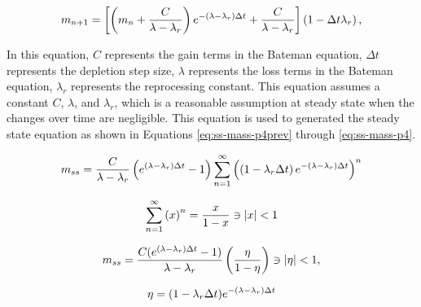 \begin{equation} \hfill 
m_{n+1} = \left[ \left(m_n + \frac{C}{\lambda - \lambda_r} \right)e^{-(\lambda - \lambda_r) \Delta t} + \frac{C}{\lambda - \lambda_r} \right] \left(1 - \Delta t \lambda_r \right),
\hfill\label{eq:nplusone-gen} \end{equation}

In this equation, $C$ represents the gain terms in the Bateman equation, $\Delta t$ represents the depletion step size, $\lambda$ represents the loss terms in the Bateman equation, $\lambda_r$ represents the reprocessing constant. This equation assumes a constant $C$, $\lambda$, and $\lambda_r$, which is a reasonable assumption at steady state when the changes over time are negligible. This equation is used to generated the steady state equation as shown in Equations \eqref{eq:ss-mass-p4prev} through \eqref{eq:ss-mass-p4}.


\begin{equation} \hfill 
m_{ss} =  \frac{C}{\lambda - \lambda_r} \left(e^{(\lambda - \lambda_r) \Delta t} - 1 \right) \sum_{n=1}^{\infty} \left( \left(1 - \lambda_r \Delta t \right) e^{-(\lambda - \lambda_r) \Delta t} \right)^n
\hfill\label{eq:ss-mass-p4prev} \end{equation}

\begin{equation} \hfill 
\sum_{n=1}^\infty \left( x \right)^n = \frac{x}{1-x} \ni |x| < 1
\hfill\label{eq:ss-mass-p4next} \end{equation}

\begin{equation} \hfill 
m_{ss} =  \frac{C (e^{(\lambda - \lambda_r) \Delta t} - 1)}{\lambda - \lambda_r}  \left( \frac{\eta}{1 - \eta} \right) \ni \left|\eta \right| < 1,
\hfill\label{eq:ss-mass-p4nextprev} \end{equation}

\begin{equation} \hfill 
\eta = (1 - \lambda_r \Delta t) e^{-(\lambda - \lambda_r) \Delta t}
\hfill\label{eq:ss-mass-p4next-simple} \end{equation}

